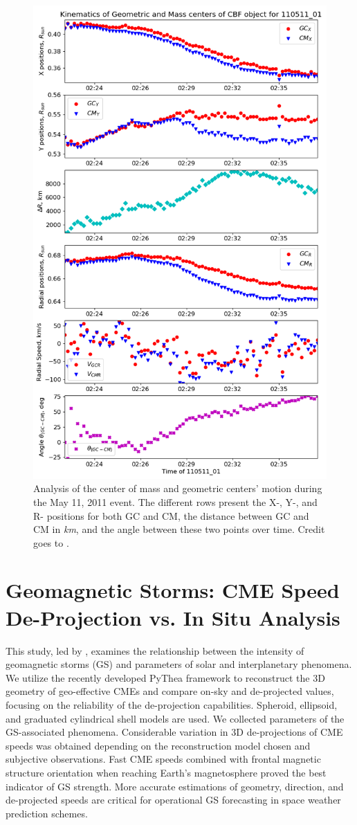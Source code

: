 \begin{figure}[!htp]
	\centering
	\includegraphics[width=0.7\hsize]{chapter2/figs/event_110511_01_centers_of_mass.png}
	\caption{Analysis of the center of mass and geometric centers' motion during the May 11, 2011 event. The different rows present the X-, Y-, and R- positions for both GC and CM, the distance between GC and CM in \textit{km}, and the angle between these two points over time. Credit goes to \citet{stepanyuk_2022}.}
	\label{fig_wavetrack_center_of_mass}
\end{figure}


\section{Geomagnetic Storms: CME Speed De-Projection vs. In Situ Analysis}
This study, led by \citet{miteva_2023}, examines the relationship between the intensity of geomagnetic storms (GS) and parameters of solar and interplanetary phenomena. We utilize the recently developed PyThea framework to reconstruct the 3D geometry of geo-effective CMEs and compare on-sky and de-projected values, focusing on the reliability of the de-projection capabilities. Spheroid, ellipsoid, and graduated cylindrical shell models are used. We collected parameters of the GS-associated phenomena. Considerable variation in 3D de-projections of CME speeds was obtained depending on the reconstruction model chosen and subjective observations. Fast CME speeds combined with frontal magnetic structure orientation when reaching Earth's magnetosphere proved the best indicator of GS strength. More accurate estimations of geometry, direction, and de-projected speeds are critical for operational GS forecasting in space weather prediction schemes.

